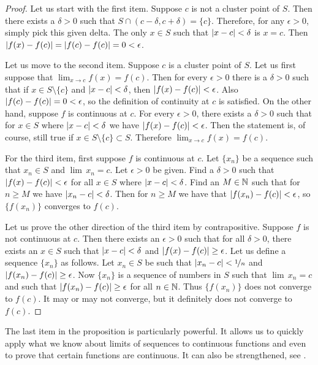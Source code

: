\begin{proof}
Let us start with the first item.  Suppose $c$ is not a cluster point of
$S$.  Then there exists a $\delta > 0$
such that $S \cap (c-\delta,c+\delta) = \{ c \}$.
Therefore, for any $\epsilon > 0$, simply pick this given delta.
The only $x \in S$ such that $\left\lvert {x-c} \right\rvert < \delta$ is $x=c$.  Then
$\left\lvert {f(x)-f(c)} \right\rvert = \left\lvert {f(c)-f(c)} \right\rvert = 0 < \epsilon$.

Let us move to the second item.
Suppose $c$ is a cluster point of $S$.  Let us first suppose
that $\lim_{x\to c} f(x) = f(c)$.  Then for every $\epsilon > 0$
there is a $\delta > 0$ such that if $x \in S \setminus \{ c \}$
and $\left\lvert {x-c} \right\rvert < \delta$, then $\left\lvert {f(x)-f(c)} \right\rvert < \epsilon$.
Also $\left\lvert {f(c)-f(c)} \right\rvert = 0 < \epsilon$, so the definition of continuity at
$c$ is satisfied.  On the other hand, suppose $f$ is continuous
at $c$.  For every $\epsilon > 0$, there exists a $\delta > 0$
such that for $x \in S$ where $\left\lvert {x-c} \right\rvert < \delta$ we have
$\left\lvert {f(x)-f(c)} \right\rvert < \epsilon$.  Then the statement is, of course, still true if
$x \in S \setminus \{ c \} \subset S$.  Therefore $\lim_{x\to c} f(x) =
f(c)$.

For the third item, first suppose $f$ is continuous at $c$.  Let $\{ x_n \}$
be a sequence such that $x_n \in S$ and $\lim\, x_n = c$.  Let $\epsilon > 0$
be given.  Find a $\delta > 0$ such that $\left\lvert {f(x)-f(c)} \right\rvert < \epsilon$
for all $x \in S$ where $\left\lvert {x-c} \right\rvert < \delta$.  Find an $M \in {\mathbb{N}}$
such that for $n \geq M$ we have $\left\lvert {x_n-c} \right\rvert < \delta$.  Then for
$n \geq M$ we have that $\left\lvert {f(x_n)-f(c)} \right\rvert < \epsilon$, so $\{ f(x_n) \}$
converges to $f(c)$.

Let us prove the other direction of the third item by contrapositive.
Suppose $f$ is not
continuous at $c$.  Then there exists an $\epsilon > 0$
such that for all $\delta > 0$, there exists an $x \in S$
such that $\left\lvert {x-c} \right\rvert < \delta$ and $\left\lvert {f(x)-f(c)} \right\rvert \geq \epsilon$.
Let us define a sequence $\{ x_n \}$ as follows.
Let $x_n \in S$ be such that $\left\lvert {x_n-c} \right\rvert < \nicefrac{1}{n}$
and $\left\lvert {f(x_n)-f(c)} \right\rvert \geq \epsilon$.
Now $\{ x_n \}$ is
a sequence of numbers in $S$ such that
$\lim\, x_n = c$ and such that
$\left\lvert {f(x_n)-f(c)} \right\rvert \geq \epsilon$ for all $n \in {\mathbb{N}}$.  Thus $\{ f(x_n) \}$
does not converge to $f(c)$.  It may or may not converge, but it definitely
does not converge to $f(c)$.  
\end{proof}

The last item in the proposition is particularly powerful.  It allows us to
quickly apply what we know about limits of sequences to continuous functions
and even to prove that certain functions are continuous.
It can also be strengthened, see .

